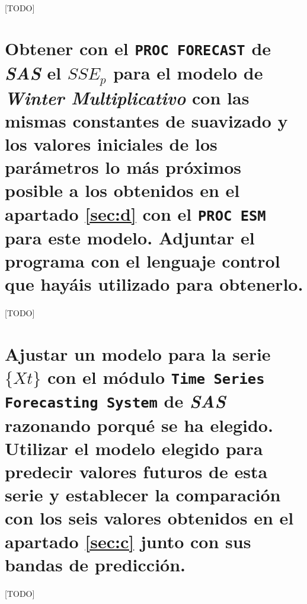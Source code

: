 \documentclass[a4paper, spanish]{article}
\begin{document}
    \paragraph{}
    [TODO]


  \section{Obtener con el \texttt{PROC FORECAST} de \emph{SAS} el $SSE_p$ para el modelo de \emph{Winter Multiplicativo} con las mismas constantes de suavizado y los valores iniciales de los parámetros lo más próximos posible a los obtenidos en el apartado \ref{sec:d} con el \texttt{PROC ESM} para este modelo. Adjuntar el programa con el lenguaje control que hayáis utilizado para obtenerlo.}
  \label{sec:e}

    \paragraph{}
    [TODO]


  \section{Ajustar un modelo para la serie $\{ Xt \}$ con el módulo \texttt{Time Series Forecasting System} de
\emph{SAS} razonando porqué se ha elegido. Utilizar el modelo elegido para predecir valores futuros de esta serie y establecer la comparación con los seis valores obtenidos en el apartado \ref{sec:c} junto con sus bandas de predicción.}
  \label{sec:f}

    \paragraph{}
    [TODO]
\end{document}
